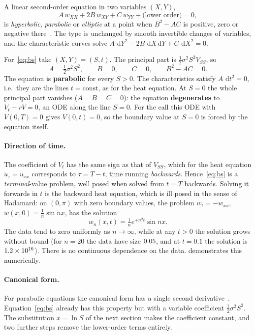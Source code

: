 \documentclass[11pt,a4paper]{article}
\theoremstyle{definition}
\theoremstyle{remark}
\newcommand{\dd}{\,\mathrm{d}}
\begin{document}
A linear second-order equation in two variables $(X,Y)$,
\[
  A\,w_{XX}+2B\,w_{XY}+C\,w_{YY}+\text{(lower order)}=0,
\]
is \emph{hyperbolic}, \emph{parabolic} or \emph{elliptic} at a point when $B^2-AC$ is positive, zero or
negative there~\cite{myintu,mcowen}. The type is unchanged by smooth invertible changes of variables,
and the characteristic curves solve $A\,\dd Y^2-2B\,\dd X\dd Y+C\,\dd X^2=0$.

For~\eqref{eq:bs} take $(X,Y)=(S,t)$. The principal part is $\tfrac12\sigma^2S^2V_{SS}$, so
\[
  A=\tfrac12\sigma^2S^2,\qquad B=0,\qquad C=0,\qquad B^2-AC=0 .
\]
The equation is \textbf{parabolic} for every $S>0$. The characteristics satisfy $A\,\dd t^2=0$, i.e.\
they are the lines $t=\text{const}$, as for the heat equation. At $S=0$ the whole principal part
vanishes ($A=B=C=0$): the equation \textbf{degenerates} to $V_t-rV=0$, an ODE along the line $S=0$.
For the call this ODE with $V(0,T)=0$ gives $V(0,t)=0$, so the boundary value at $S=0$ is forced by
the equation itself.

\paragraph{Direction of time.} The coefficient of $V_t$ has the same sign as that of $V_{SS}$, which
for the heat equation $u_\tau=u_{xx}$ corresponds to $\tau=T-t$, time running \emph{backwards}.
Hence~\eqref{eq:bs} is a \emph{terminal}-value problem, well posed when solved from $t=T$ backwards.
Solving it forwards in $t$ is the backward heat equation, which is ill posed in the sense of Hadamard:
on $(0,\pi)$ with zero boundary values, the problem $w_t=-w_{xx}$, $w(x,0)=\tfrac1n\sin nx$, has the solution
\begin{equation}\label{eq:hadamard}
  w_n(x,t)=\tfrac1n e^{+n^2t}\sin nx .
\end{equation}
The data tend to zero uniformly as $n\to\infty$, while at any $t>0$ the solution grows without bound
(for $n=20$ the data have size $\num{0.05}$, and at $t=0.1$ the solution is $\num{1.2e16}$).
There is no continuous dependence on the data. \Cref{sec:limits} demonstrates this numerically.

\paragraph{Canonical form.} For parabolic equations the canonical form has a single second
derivative~\cite{myintu,mcowen}. Equation~\eqref{eq:bs} already has this property but with a
variable coefficient $\tfrac12\sigma^2S^2$. The substitution $x=\ln S$ of the next section makes the
coefficient constant, and two further steps remove the lower-order terms entirely.
\end{document}
